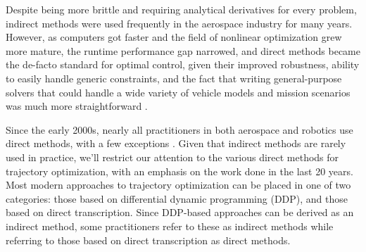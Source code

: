 \documentclass[../root.tex]{subfiles}
\begin{document}
Despite being more brittle and requiring analytical derivatives for every problem, indirect methods 
were used frequently in the aerospace industry for many years. However, as computers got faster and 
the field of nonlinear optimization grew more mature, the runtime performance gap narrowed, and direct
methods became the de-facto standard for optimal control, given their improved robustness, ability to 
easily handle generic constraints, and the fact that writing general-purpose solvers that could
handle a wide variety of vehicle models and mission scenarios was much more straightforward \cite{betts_Survey_1998}.

Since the early 2000s, nearly all practitioners in both aerospace and robotics use direct methods, 
with a few exceptions \cite{antony_Rapid_2017}. Given that indirect methods are rarely used in practice, 
we'll restrict our attention to the various direct methods for trajectory optimization, with an 
emphasis on the work done in the last 20 years. Most modern approaches to trajectory optimization 
can be placed in one of two categories: those based on differential dynamic programming (DDP), and
those based on direct transcription. Since DDP-based approaches can be derived as an indirect method, 
some practitioners refer to these as indirect methods while referring to those based on direct 
transcription as direct methods. 
\end{document}
